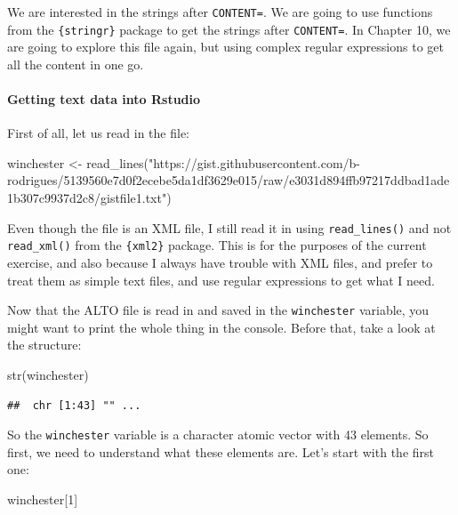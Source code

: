 \documentclass[
]{article}
\newenvironment{Shaded}{\begin{snugshade}}{\end{snugshade}}
\newcommand{\DecValTok}[1]{\textcolor[rgb]{0.00,0.00,0.81}{#1}}
\newcommand{\FunctionTok}[1]{\textcolor[rgb]{0.00,0.00,0.00}{#1}}
\newcommand{\NormalTok}[1]{#1}
\newcommand{\OtherTok}[1]{\textcolor[rgb]{0.56,0.35,0.01}{#1}}
\newcommand{\StringTok}[1]{\textcolor[rgb]{0.31,0.60,0.02}{#1}}
\begin{document}
We are interested in the strings after \texttt{CONTENT=}. We are going to use functions from the \texttt{\{stringr\}}
package to get the strings after \texttt{CONTENT=}. In Chapter 10, we are going to explore this file
again, but using complex regular expressions to get all the content in one go.

\hypertarget{getting-text-data-into-rstudio}{%
\paragraph{Getting text data into Rstudio}\label{getting-text-data-into-rstudio}}

First of all, let us read in the file:

\begin{Shaded}
\begin{Highlighting}[]
\NormalTok{winchester }\OtherTok{\textless{}{-}} \FunctionTok{read\_lines}\NormalTok{(}\StringTok{"https://gist.githubusercontent.com/b{-}rodrigues/5139560e7d0f2ecebe5da1df3629e015/raw/e3031d894ffb97217ddbad1ade1b307c9937d2c8/gistfile1.txt"}\NormalTok{)}
\end{Highlighting}
\end{Shaded}

Even though the file is an XML file, I still read it in using \texttt{read\_lines()} and not \texttt{read\_xml()}
from the \texttt{\{xml2\}} package. This is for the purposes of the current exercise, and also because I
always have trouble with XML files, and prefer to treat them as simple text files, and use regular
expressions to get what I need.

Now that the ALTO file is read in and saved in the \texttt{winchester} variable, you might want to print
the whole thing in the console. Before that, take a look at the structure:

\begin{Shaded}
\begin{Highlighting}[]
\FunctionTok{str}\NormalTok{(winchester)}
\end{Highlighting}
\end{Shaded}

\begin{verbatim}
##  chr [1:43] "" ...
\end{verbatim}

So the \texttt{winchester} variable is a character atomic vector with 43 elements. So first, we need to
understand what these elements are. Let's start with the first one:

\begin{Shaded}
\begin{Highlighting}[]
\NormalTok{winchester[}\DecValTok{1}\NormalTok{]}
\end{Highlighting}
\end{Shaded}
\end{document}
